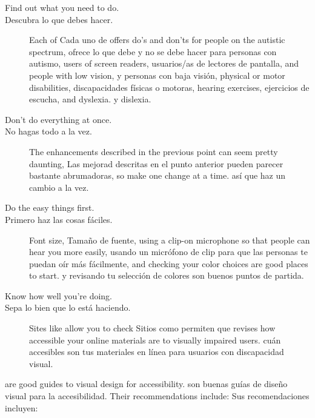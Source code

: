 \begin{description}

\item[Find out what you need to do.]
\item[Descubra lo que debes hacer.]
  Each of 
  Cada uno de 
  offers do's and don'ts for people on the autistic spectrum,
  ofrece lo que debe y no se debe hacer para personas con autismo,
  users of screen readers,
  usuarios/as de lectores de pantalla,
  and people with low vision,
  y personas con baja visión,
  physical or motor disabilities,
  discapacidades físicas o motoras,
  hearing exercises,
  ejercicios de escucha,
  and dyslexia.
  y dislexia.

\item[Don't do everything at once.]
\item[No hagas todo a la vez.]
  The enhancements described in the previous point can seem pretty daunting,
  Las mejorad descritas en el punto anterior pueden parecer bastante abrumadoras,
  so make one change at a time.
  así que haz un cambio a la vez.

\item[Do the easy things first.]
\item[Primero haz las cosas fáciles.]
  Font size,
  Tamaño de fuente,
  using a clip-on microphone so that people can hear you more easily,
  usando un micrófono de clip para que las personas te puedan oír más fácilmente,
  and checking your color choices are good places to start.
  y revisando tu selección de colores son buenos puntos de partida.

\item[Know how well you're doing.]
\item[Sepa lo bien que lo está haciendo.]
  Sites like  allow you to check
  Sitios como  permiten que revises
  how accessible your online materials are to visually impaired users.
  cuán accesibles son tus materiales en línea para usuarios con discapacidad visual.

\end{description}

\cite{Coom2012,Burg2015} are good guides to visual design for accessibility.
\cite{Coom2012,Burg2015} son buenas guías de diseño visual para la accesibilidad.
Their recommendations include:
Sus recomendaciones incluyen:

